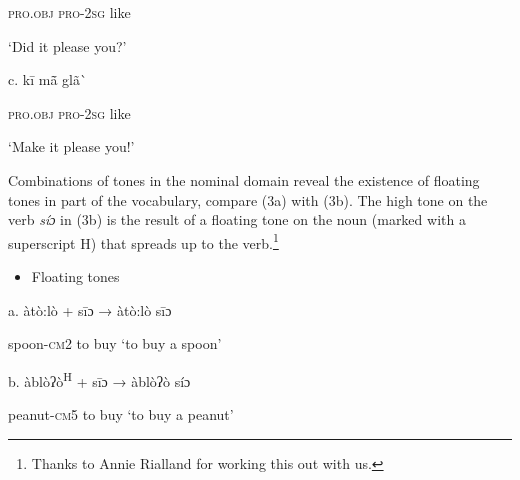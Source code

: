 \begin{styleindexi}
    \textsc{pro}.\textsc{obj}     \textsc{pro}{}-2\textsc{sg}   like
\end{styleindexi}

\begin{styleindexi}
    ‘Did it please you?’              
\end{styleindexi}

\begin{styleindexi}
c.   kī              mã\={}             glã\`{} 
\end{styleindexi}

\begin{styleindexi}
    \textsc{pro}.\textsc{obj}    \textsc{pro}{}-2\textsc{sg}   like
\end{styleindexi}

\begin{styleindexi}
    ‘Make it please you!’ 
\end{styleindexi}

Combinations of tones in the nominal domain reveal the existence of floating tones in part of the vocabulary, compare (3a) with (3b). The high tone on the verb \textit{síɔ} in (3b) is the result of a floating tone on the noun (marked with a superscript H) that spreads up to the verb.\footnote{\textsuperscript{} Thanks to Annie Rialland for working this out with us.}  

\begin{itemize}
\item \begin{styleindexi}
   Floating tones
\end{styleindexi}\end{itemize}
\begin{styleindexi}
  a.   àtò:lò            +    sīɔ                  →          àtò:lò sīɔ
\end{styleindexi}

\begin{styleindexi}
      spoon-\textsc{cm}2           to buy                          ‘to buy a spoon’
\end{styleindexi}

\begin{styleindexi}
  b.   àblòʔò\textsuperscript{H}          +    sīɔ                  →          àblòʔò síɔ           
\end{styleindexi}

\begin{styleindexi}
      peanut-\textsc{cm}5    to buy                          ‘to buy a peanut’
\end{styleindexi}

